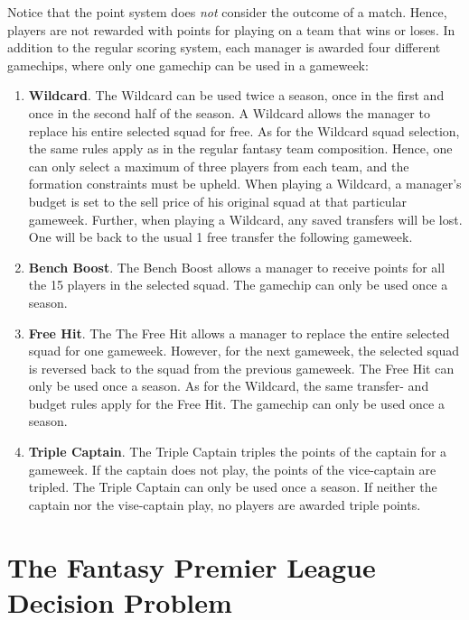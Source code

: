 Notice that the point system does \textit{not} consider the outcome of a match. Hence, players are not rewarded with points for playing on a team that wins or loses. In addition to the regular scoring system, each manager is awarded four different gamechips, where only one gamechip can be used in a gameweek: 
\begin{enumerate} [label=(\roman*)]

\item \textbf{Wildcard}. The Wildcard can be used twice a season, once in the first and once in the second half of the season. A Wildcard allows the manager to replace his entire selected squad for free. As for the Wildcard squad selection, the same rules apply as in the regular fantasy team composition. Hence, one can only select a maximum of three players from each team, and the formation constraints must be upheld. When playing a Wildcard, a manager's budget is set to the sell price of his original squad at that particular gameweek. Further, when playing a Wildcard, any saved transfers will be lost. One will be back to the usual 1 free transfer the following gameweek.

\item \textbf{Bench Boost}. The Bench Boost allows a manager to receive points for all the 15 players in the selected squad. The gamechip can only be used once a season. 

\item \textbf{Free Hit}. The The Free Hit allows a manager to replace the entire selected squad for one gameweek. However, for the next gameweek, the selected squad is reversed back to the squad from the previous gameweek. The Free Hit can only be used once a season. As for the Wildcard, the same transfer- and budget rules apply for the Free Hit. The gamechip can only be used once a season.

\item \textbf{Triple Captain}. The Triple Captain triples the points of the captain for a gameweek. If the captain does not play, the points of the vice-captain are tripled. The Triple Captain can only be used once a season. If neither the captain nor the vise-captain play, no players are awarded triple points.
\end{enumerate}

\section{The Fantasy Premier League Decision Problem} \label{section_prob_desc_fpldp}

